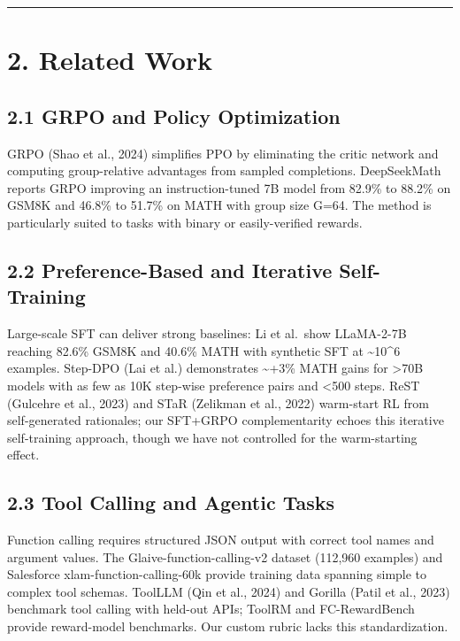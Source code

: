 \documentclass[
  american,
  11pt,
  a4paper,
  oneside]{report}
\begin{document}
\begin{center}\rule{0.5\linewidth}{0.5pt}\end{center}

\chapter{2. Related Work}\label{related-work}

\section{2.1 GRPO and Policy
Optimization}\label{grpo-and-policy-optimization}

GRPO (Shao et al., 2024) simplifies PPO by eliminating the critic
network and computing group-relative advantages from sampled
completions. DeepSeekMath reports GRPO improving an instruction-tuned 7B
model from 82.9\% to 88.2\% on GSM8K and 46.8\% to 51.7\% on MATH with
group size G=64. The method is particularly suited to tasks with binary
or easily-verified rewards.

\section{2.2 Preference-Based and Iterative
Self-Training}\label{preference-based-and-iterative-self-training}

Large-scale SFT can deliver strong baselines: Li et al.~show LLaMA-2-7B
reaching 82.6\% GSM8K and 40.6\% MATH with synthetic SFT at
\textasciitilde10\^{}6 examples. Step-DPO (Lai et al.) demonstrates
\textasciitilde+3\% MATH gains for \textgreater70B models with as few as
10K step-wise preference pairs and \textless500 steps. ReST (Gulcehre et
al., 2023) and STaR (Zelikman et al., 2022) warm-start RL from
self-generated rationales; our SFT+GRPO complementarity echoes this
iterative self-training approach, though we have not controlled for the
warm-starting effect.

\section{2.3 Tool Calling and Agentic
Tasks}\label{tool-calling-and-agentic-tasks}

Function calling requires structured JSON output with correct tool names
and argument values. The Glaive-function-calling-v2 dataset (112,960
examples) and Salesforce xlam-function-calling-60k provide training data
spanning simple to complex tool schemas. ToolLLM (Qin et al., 2024) and
Gorilla (Patil et al., 2023) benchmark tool calling with held-out APIs;
ToolRM and FC-RewardBench provide reward-model benchmarks. Our custom
rubric lacks this standardization.
\end{document}
